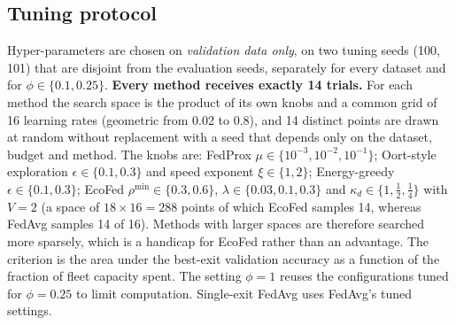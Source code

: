 \subsection{Tuning protocol}
Hyper-parameters are chosen on \emph{validation data only}, on two tuning seeds (100, 101) that are disjoint from the evaluation seeds, separately for every dataset and for $\phi\in\{0.1,0.25\}$. \textbf{Every method receives exactly 14 trials.} For each method the search space is the product of its own knobs and a common grid of 16 learning rates (geometric from 0.02 to 0.8), and 14 distinct points are drawn at random without replacement with a seed that depends only on the dataset, budget and method. The knobs are: FedProx $\mu\in\{10^{-3},10^{-2},10^{-1}\}$; Oort-style exploration $\epsilon\in\{0.1,0.3\}$ and speed exponent $\xi\in\{1,2\}$; Energy-greedy $\epsilon\in\{0.1,0.3\}$; EcoFed $\rho^{\min}\in\{0.3,0.6\}$, $\lambda\in\{0.03,0.1,0.3\}$ and $\kappa_d\in\{1,\tfrac12,\tfrac14\}$ with $V=2$ (a space of $18\times16=288$ points of which EcoFed samples 14, whereas FedAvg samples 14 of 16). Methods with larger spaces are therefore searched more sparsely, which is a handicap for EcoFed rather than an advantage. The criterion is the area under the best-exit validation accuracy as a function of the fraction of fleet capacity spent. The setting $\phi=1$ reuses the configurations tuned for $\phi=0.25$ to limit computation. Single-exit FedAvg uses FedAvg's tuned settings.

